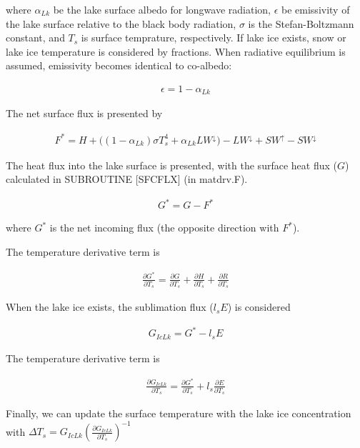where \(\alpha_{Lk}\) be the lake surface albedo for longwave radiation, \(\epsilon\) be emissivity of the lake surface relative to the black body radiation, \(\sigma\) is the Stefan-Boltzmann
constant, and \(T_s\) is surface temprature, respectively. If lake ice exists, snow or lake ice temperature is considered by fractions. When radiative equilibrium is assumed, emissivity becomes
identical to co-albedo:

\begin{eqnarray}
    \epsilon = 1 - \alpha_{Lk}
\end{eqnarray}

The net surface flux is presented by

\begin{eqnarray}
    F^\ast=H + \Big((1-\alpha_{Lk})\sigma T_s^4 + \alpha_{Lk} LW^\downarrow\Big)  - LW^\downarrow +SW^\uparrow - SW^\downarrow      
\end{eqnarray}

The heat flux into the lake surface is presented, with the surface heat flux (\(G\)) calculated in SUBROUTINE {[}SFCFLX{]} (in matdrv.F).

\begin{eqnarray}
    G^\ast = G - F^\ast
\end{eqnarray}

where \(G^{\ast}\) is the net incoming flux (the opposite direction with \(F^{\ast}\)).

The temperature derivative term is

\begin{eqnarray}
    \frac{\partial G^\ast}{\partial T_s} = \frac{\partial G}{\partial T_s}+\frac{\partial H}{\partial T_s}+\frac{\partial R}{\partial T_s}
\end{eqnarray}

When the lake ice exists, the sublimation flux (\(l_sE\)) is considered

\begin{eqnarray}
    G_{IcLk} = G^\ast - l_s E
\end{eqnarray}

The temperature derivative term is

\begin{eqnarray}
    \frac{\partial G_{IcLk}}{\partial T_s}=\frac{\partial G^\ast}{\partial T_s} + l_s\frac{\partial E}{\partial T_s}
\end{eqnarray}

Finally, we can update the surface temperature with the lake ice concentration with \(\Delta T_s=G_{IcLk} ( \frac{\partial G_{IcLk}}{\partial T_s})^{-1}\)

